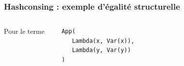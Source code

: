 \begin{frame}[fragile]
\frametitle{Hashconsing : exemple d'égalité structurelle}

\begin{columns}
  Pour le terme 
  \begin{verbatim}
  App(
     Lambda(x, Var(x)), 
     Lambda(y, Var(y))
  )
  \end{verbatim}

  \medskip

  

\end{columns}
\end{frame}
